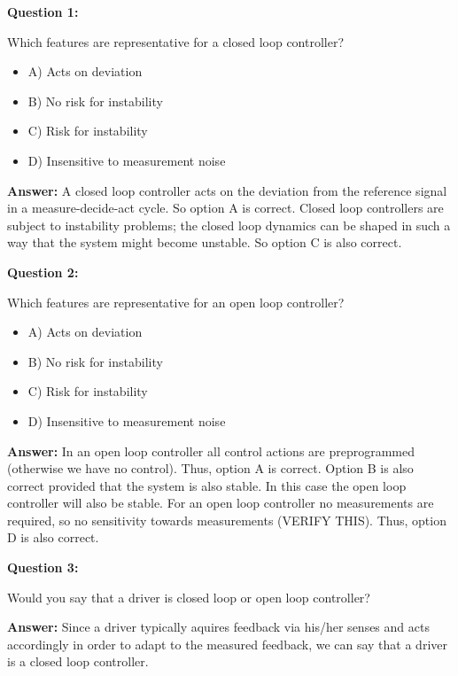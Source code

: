 \textbf{Question 1:}

Which features are representative for a closed loop controller?

\begin{itemize}
\item A) Acts on deviation
\item B) No risk for instability
\item C) Risk for instability
\item D) Insensitive to measurement noise 
\end{itemize}

\textbf{Answer:}
A closed loop controller acts on the deviation from the reference signal in a measure-decide-act cycle. So 
option A is correct. Closed loop controllers are subject to instability problems; the closed loop dynamics can be shaped in such a way that the system might become unstable. So option C is also correct.


\textbf{Question 2:}

Which features are representative for an open loop controller?

\begin{itemize}
\item A) Acts on deviation
\item B) No risk for instability
\item C) Risk for instability
\item D) Insensitive to measurement noise 
\end{itemize}

\textbf{Answer:}
In an open loop controller all control actions are preprogrammed (otherwise we have no control). Thus, option A is correct. Option B is also correct provided that the system is also stable. In this case the open loop controller will also be stable. For an open loop controller no measurements are required, so no sensitivity towards measurements (VERIFY THIS). Thus, option D is also correct. 


\textbf{Question 3:}

Would you say that a driver is closed loop or open loop controller? 

\textbf{Answer:}
Since a driver typically aquires feedback via his/her senses and acts accordingly in order to adapt to the measured feedback, we can say that a driver is a closed loop controller.




